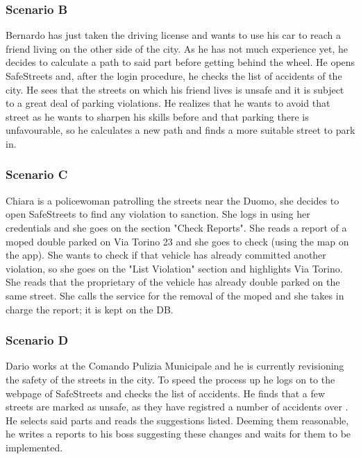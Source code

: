 \subsubsection*{Scenario B}

Bernardo has just taken the driving license and wants to use his car to reach a friend living on the other side of the city. As he has not much experience yet, he decides to calculate a path to said part before getting behind the wheel. He opens SafeStreets and, after the login procedure, he checks the list of accidents of the city. He sees that the streets on which his friend lives is unsafe and it is subject to a great deal of parking violations. He realizes that he wants to avoid that street as he wants to sharpen his skills before and that parking there is unfavourable, so he calculates a new path and finds a more suitable street to park in.

\subsubsection*{Scenario C}

Chiara is a policewoman patrolling the streets near the Duomo, she decides to open SafeStreets to find any violation to sanction. She logs in using her credentials and she goes on the section "Check Reports". She reads a report of a moped double parked on Via Torino 23 and she goes to check (using the map on the app). She wants to check if that vehicle has already committed another violation, so she goes on the "List Violation" section and highlights Via Torino. She reads that the proprietary of the vehicle has already double parked on the same street. She calls the service for the removal of the moped and she takes in charge the report; it is kept on the DB.

\subsubsection*{Scenario D}

Dario works at the Comando Pulizia Municipale and he is currently revisioning the safety of the streets in the city. To speed the process up he logs on to the webpage of SafeStreets and checks the list of accidents. He finds that a few streets are marked as unsafe, as they have registred a number of accidents over \tres . He selects said parts and reads the suggestions listed. Deeming them reasonable, he writes a reports to his boss suggesting these changes and waits for them to be implemented.

